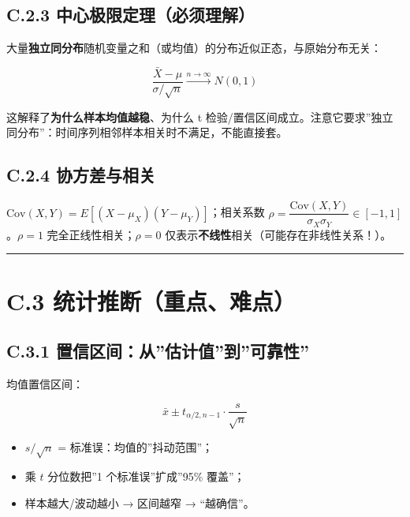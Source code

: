\subsection{C.2.3
中心极限定理（必须理解）}\label{c.2.3-ux4e2dux5fc3ux6781ux9650ux5b9aux7406ux5fc5ux987bux7406ux89e3}

大量\textbf{独立同分布}随机变量之和（或均值）的分布近似正态，与原始分布无关：

\[\frac{\bar{X}-\mu}{\sigma/\sqrt n}\xrightarrow{ n\to\infty } N(0,1)\]

这解释了\textbf{为什么样本均值越稳}、为什么 t
检验/置信区间成立。注意它要求''独立同分布''：时间序列相邻样本相关时不满足，不能直接套。

\subsection{C.2.4
协方差与相关}\label{c.2.4-ux534fux65b9ux5deeux4e0eux76f8ux5173}

\(\mathrm{Cov}(X,Y)=E[(X-\mu_X)(Y-\mu_Y)]\)；相关系数
\(\rho=\dfrac{\mathrm{Cov}(X,Y)}{\sigma_X\sigma_Y}\in[-1,1]\)。\(\rho=1\)
完全正线性相关；\(\rho=0\)
仅表示\textbf{不线性}相关（可能存在非线性关系！）。

\begin{center}\rule{0.5\linewidth}{0.5pt}\end{center}

\section{C.3
统计推断（重点、难点）}\label{c.3-ux7edfux8ba1ux63a8ux65adux91cdux70b9ux96beux70b9}

\subsection{C.3.1
置信区间：从''估计值''到''可靠性''}\label{c.3.1-ux7f6eux4fe1ux533aux95f4ux4eceux4f30ux8ba1ux503cux5230ux53efux9760ux6027}

均值置信区间：

\[\bar{x}\pm t_{\alpha/2,n-1}\cdot\frac{s}{\sqrt n}\]

\begin{itemize}
\tightlist
\item
  \(s/\sqrt n\) = 标准误：均值的''抖动范围''；
\item
  乘 \(t\) 分位数把''1 个标准误''扩成''95\% 覆盖''；
\item
  样本越大/波动越小 → 区间越窄 → ``越确信''。
\end{itemize}

